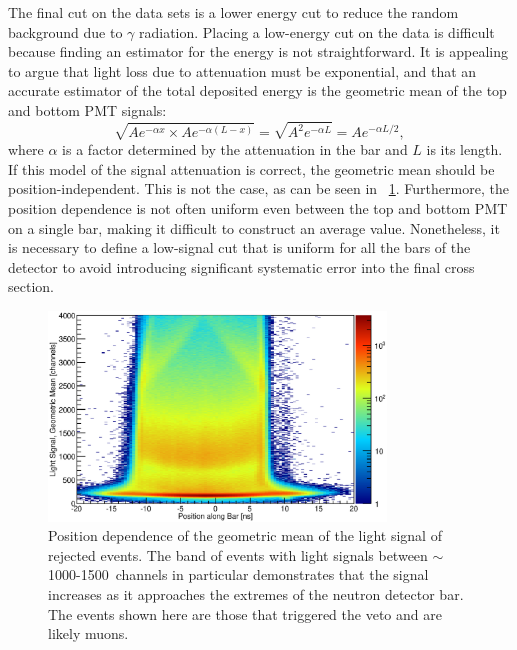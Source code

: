 The final cut on the data sets is a lower energy cut to reduce the random background due to $\gamma$ radiation.  Placing a low-energy cut on the data is difficult because finding an estimator for the energy is not straightforward.  It is appealing to argue that light loss due to attenuation must be exponential, and that an accurate estimator of the total deposited energy is the geometric mean of the top and bottom PMT signals:
\begin{equation}
\sqrt{Ae^{-\alpha x}\times Ae^{-\alpha (L-x)}} = \sqrt{A^2e^{-\alpha L}} = Ae^{-\alpha L/2},
\end{equation}
where $\alpha$ is a factor determined by the attenuation in the bar and $L$ is its length.  If this model of the signal attenuation is correct, the geometric mean should be position-independent.  This is not the case, as can be seen in {\fig}~\ref{fig:product_positionDependence}.  Furthermore, the position dependence is not often uniform even between the top and bottom PMT on a single bar, making it difficult to construct an average value.  Nonetheless, it is necessary to define a low-signal cut that is uniform for all the bars of the detector to avoid introducing significant systematic error into the final cross section.
\begin{figure}[!htbp]
\centering
\includegraphics[width=0.8\textwidth]{figures/positionVSenergy.eps}
\caption{Position dependence of the geometric mean of the light signal of rejected events.  The band of events with light signals between $\sim$1000-1500~channels in particular demonstrates that the signal increases as it approaches the extremes of the neutron detector bar.  The events shown here are those that triggered the veto and are likely muons.}
\label{fig:product_positionDependence}
\end{figure}

